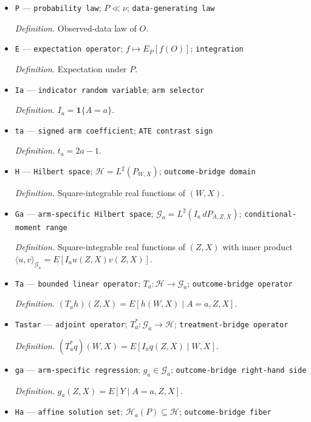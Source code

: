 \documentclass{article}
\begin{document}
\begin{itemize}
  \item \texttt{P} --- \texttt{probability law}; \(P\ll\nu\); \texttt{data-\allowbreak{}generating law}
  \par\smallskip\noindent\emph{Definition.} Observed-data law of \(O\).
  \item \texttt{E} --- \texttt{expectation operator}; \(f\mapsto E_P[f(O)]\); \texttt{integration}
  \par\smallskip\noindent\emph{Definition.} Expectation under \(P\).
  \item \texttt{Ia} --- \texttt{indicator random variable}; \texttt{arm selector}
  \par\smallskip\noindent\emph{Definition.} \(I_a=\mathbf 1\{A=a\}\).
  \item \texttt{ta} --- \texttt{signed arm coefficient}; \texttt{ATE contrast sign}
  \par\smallskip\noindent\emph{Definition.} \(t_a=2a-1\).
  \item \texttt{H} --- \texttt{Hilbert space}; \(\mathcal H=L^2(P_{W,X})\); \texttt{outcome-\allowbreak{}bridge domain}
  \par\smallskip\noindent\emph{Definition.} Square-integrable real functions of \((W,X)\).
  \item \texttt{Ga} --- \texttt{arm-\allowbreak{}specific Hilbert space}; \(\mathcal G_a=L^2(I_a\,dP_{A,Z,X})\); \texttt{conditional-\allowbreak{}moment range}
  \par\smallskip\noindent\emph{Definition.} Square-integrable real functions of \((Z,X)\) with inner product \(\langle u,v\rangle_{\mathcal G_a}=E[I_a u(Z,X)v(Z,X)]\).
  \item \texttt{Ta} --- \texttt{bounded linear operator}; \(T_a:\mathcal H\to\mathcal G_a\); \texttt{outcome-\allowbreak{}bridge operator}
  \par\smallskip\noindent\emph{Definition.} \((T_a h)(Z,X)=E[h(W,X)\mid A=a,Z,X]\).
  \item \texttt{Tastar} --- \texttt{adjoint operator}; \(T_a^*:\mathcal G_a\to\mathcal H\); \texttt{treatment-\allowbreak{}bridge operator}
  \par\smallskip\noindent\emph{Definition.} \((T_a^*q)(W,X)=E[I_a q(Z,X)\mid W,X]\).
  \item \texttt{ga} --- \texttt{arm-\allowbreak{}specific regression}; \(g_a\in\mathcal G_a\); \texttt{outcome-\allowbreak{}bridge right-\allowbreak{}hand side}
  \par\smallskip\noindent\emph{Definition.} \(g_a(Z,X)=E[Y\mid A=a,Z,X]\).
  \item \texttt{Ha} --- \texttt{affine solution set}; \(\mathcal H_a(P)\subseteq\mathcal H\); \texttt{outcome-\allowbreak{}bridge fiber}

\end{itemize}
\end{document}
